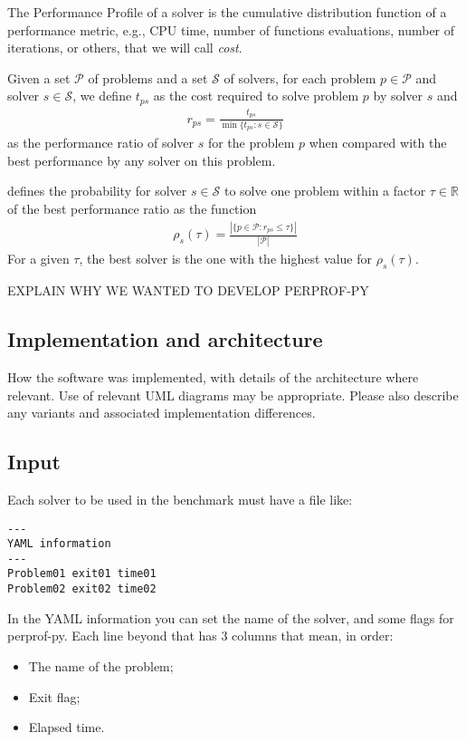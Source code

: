 \documentclass[10pt,a4paper]{article}
\def\Pset{\mathcal{P}}
\def\Sset{\mathcal{S}}
\begin{document}
The Performance Profile of a solver is the cumulative distribution
    function of a performance metric, e.g., CPU time, number of functions
    evaluations, number of iterations, or others, that we will call \emph{cost}.

    Given a set $\Pset$ of problems and a set $\Sset$ of solvers, for each problem $p
    \in \Pset$ and solver $s \in \Sset$, we define $t_{ps}$ as the cost
    required to solve problem $p$ by solver $s$ and
    \begin{align*}
      r_{ps} = \frac{t_{ps}}{\min\{t_{ps}: s \in \Sset\}}
    \end{align*}
    as the performance ratio of solver $s$ for the problem $p$ when compared
    with the best performance by any solver on this problem.

    \textcite{Dolan:2002du} defines the probability for solver $s \in \Sset$ to solve one
    problem within a factor $\tau \in \mathds{R}$ of the best performance
    ratio as the function
    \begin{align*}
      \rho_s(\tau) = \frac{| \{p \in \Pset: r_{ps} \leq \tau\} |}{| \Pset |}
    \end{align*}
     For a given $\tau$, the best solver is the one with the highest
    value for $\rho_s(\tau)$.

    EXPLAIN WHY WE WANTED TO DEVELOP PERPROF-PY

\subsection*{Implementation and architecture}
How the software was implemented, with details of the architecture where relevant. Use of relevant UML diagrams may be appropriate. Please also describe any variants and associated implementation differences.

\subsection*{Input}
    Each solver to be used in the benchmark must have a file like:

    \begin{verbatim}
---
YAML information
---
Problem01 exit01 time01
Problem02 exit02 time02
    \end{verbatim}

    In the YAML information you can set the name of the solver, and some
    flags for perprof-py.
    Each line beyond that has 3 columns that mean, in order:
    \begin{itemize}
      \item The name of the problem;
      \item Exit flag;
      \item Elapsed time.
    \end{itemize}
\end{document}
